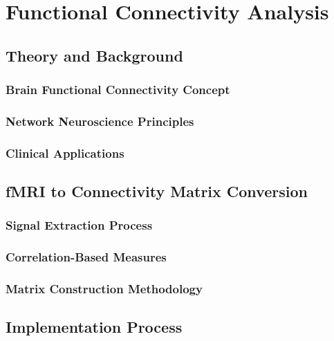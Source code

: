 \documentclass[12pt,a4paper]{report}
\begin{document}
\section{Functional Connectivity Analysis}

\subsection{Theory and Background}

\subsubsection{Brain Functional Connectivity Concept}

\subsubsection{Network Neuroscience Principles}

\subsubsection{Clinical Applications}

\subsection{fMRI to Connectivity Matrix Conversion}

\subsubsection{Signal Extraction Process}

\subsubsection{Correlation-Based Measures}

\subsubsection{Matrix Construction Methodology}

\subsection{Implementation Process}
\end{document}
